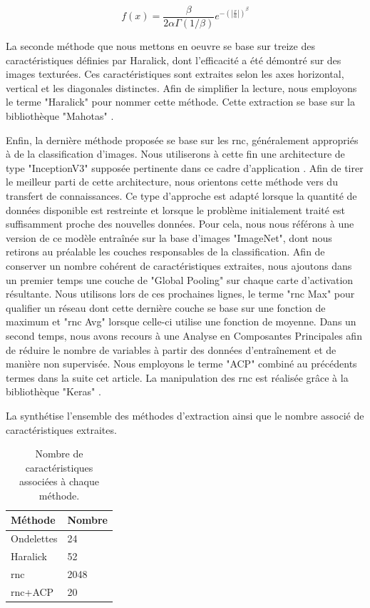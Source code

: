 \documentclass{gretsi}
\begin{document}
\begin{sloppypar}
\begin{equation}
    f(x)= \frac{\beta}{2\alpha\Gamma(1/\beta)} e^{-\left(|\frac{x}{\alpha}|\right)^\beta}
    \label{ggd}
\end{equation}

La seconde méthode que nous mettons en oeuvre se base sur treize des caractéristiques définies par Haralick, dont l'efficacité a été démontré sur des images texturées. Ces caractéristiques sont extraites selon les axes horizontal, vertical et les diagonales distinctes. Afin de simplifier la lecture, nous employons le terme "Haralick" pour nommer cette méthode. Cette extraction se base sur la bibliothèque "Mahotas" \cite{coelho2012mahotas}.\par

Enfin, la dernière méthode proposée se base sur les \acs{rnc}, généralement appropriés à de la classification d'images. Nous utiliserons à cette fin une architecture de type "InceptionV3" supposée pertinente dans ce cadre d'application \cite{Litjens2017}. Afin de tirer le meilleur parti de cette architecture, nous orientons cette méthode vers du transfert de connaissances. Ce type d'approche est adapté lorsque la quantité de données disponible est restreinte et lorsque le problème initialement traité est suffisamment proche des nouvelles données. Pour cela, nous nous référons à une version de ce modèle entraînée sur la base d'images "ImageNet", dont nous retirons au préalable les couches responsables de la classification. Afin de conserver un nombre cohérent de caractéristiques extraites, nous ajoutons dans un premier temps une couche de "Global Pooling" sur chaque carte d'activation résultante. Nous utilisons lors de ces prochaines lignes, le terme "\ac{rnc} Max" pour qualifier un réseau dont cette dernière couche se base sur une fonction de maximum et "\ac{rnc} Avg" lorsque celle-ci utilise une fonction de moyenne. Dans un second temps, nous avons recours à une Analyse en Composantes Principales afin de réduire le nombre de variables à partir des données d'entraînement et de manière non supervisée. Nous employons le terme "ACP" combiné au précédents termes dans la suite cet article. La manipulation des \ac{rnc} est réalisée grâce à la bibliothèque "Keras" \cite{chollet2015keras}.\par
La  synthétise l'ensemble des méthodes d'extraction ainsi que le nombre associé de caractéristiques extraites.
\begin{table}[h]
\centering
    \begin{tabular*}{0.6\linewidth}{l@{\extracolsep{\fill}}l}
        \hline
        \textbf{Méthode} & \textbf{Nombre} \\
        \hline
        Ondelettes & 24 \\
        \hline
        Haralick & 52\\
        \hline
        \ac{rnc} & 2048\\
        \hline
        \ac{rnc}+ACP & 20\\
        \hline
    \end{tabular*}
    \caption{Nombre de caractéristiques associées à chaque méthode.}
    \label{variables}
\end{table}


\end{sloppypar}
\end{document}
